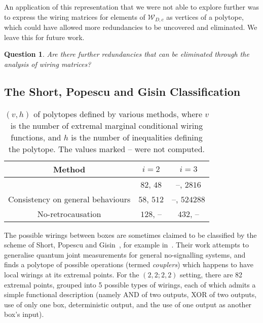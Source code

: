 \documentclass[10pt, a4paper]{article}
\numberwithin{equation}{section} %
\theoremstyle{definition}
\theoremstyle{plain}
\newtheorem{question}{Question}
\newenvironment{Tabular}[1] %
{\def\arraystretch{1.75}\begin{tabular}{#1}}
{\end{tabular}}
\newcommand{\?}{\mathrel{?}} %
\newcommand{\sW}{\mathcal{W}}
\begin{document}
                  An application of this representation that we were not able to explore further was to express the wiring matrices for elements of \(\sW_{D,c}\) as vertices of a polytope, which could have allowed more redundancies to be uncovered and eliminated. We leave this for future work.
                  \begin{question}
                    Are there further redundancies that can be eliminated through the analysis of wiring matrices?
                  \end{question}

                  \subsection{The Short, Popescu and Gisin Classification}\label{sec:locwir_SPG}

              \begin{table}
                  \centering
                      \begin{Tabular}{ccc} 
                        \toprule
                        Method & \(i = 2\) & \(i = 3\) \\
                        \midrule
                        \cite{ShortEntangleSwap} & \(82\), \(48\)  & --, \(2816\) \\
                        Consistency on general behaviours & \(58\), \(512\) & --, \(524288\) \\
                        No-retrocausation & \(128\), -- & \(432\), -- \\
                        \bottomrule
                      \end{Tabular}
                      \caption{\((v,h)\) of polytopes defined by various methods, where \(v\) is the number of extremal marginal conditional wiring functions, and \(h\) is the number of inequalities defining the polytope. The values marked -- were not computed.}\label{tab:polys}
              \end{table}

                  The possible wirings between boxes are sometimes claimed to be classified by the scheme of Short, Popescu and Gisin~\cite{ShortEntangleSwap}, for example in~\cite{ShortClassClaim}. Their work attempts to generalise quantum joint measurements for general no-signalling systems, and finds a polytope of possible operations (termed \emph{couplers}) which happens to have local wirings at its extremal points. For the  \((2,2;2,2)\) setting, there are 82 extremal points, grouped into 5 possible types of wirings, each of which admits a simple functional description (namely AND of two outputs, XOR of two outputs, use of only one box, deterministic output, and the use of one output as another box's input).
\end{document}
